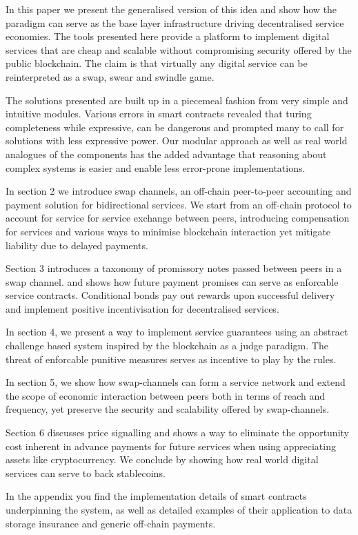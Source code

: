 \documentclass[a4paper,10pt]{article}
\begin{document}
In this paper we present the generalised version of this idea and show how the paradigm
can serve as the base layer infrastructure driving decentralised service economies.
The tools presented here provide a platform to implement digital services that are
cheap and scalable without compromising security offered by the public blockchain.
The claim is that virtually any digital service can be reinterpreted as a swap, swear and swindle game.

The solutions presented are built up in a piecemeal fashion from very simple and intuitive
modules. Various errors in smart contracts revealed that turing completeness while expressive, can
be dangerous and prompted many to call for solutions with less expressive power.
Our modular approach as well as real world analogues of the components has the added
advantage that reasoning about complex systems is easier
and enable less error-prone implementations.

In section 2 we introduce swap channels, an off-chain peer-to-peer accounting and
payment solution for bidirectional services. We start from an off-chain protocol to
account for service for service exchange between peers, introducing compensation for services
and various ways to minimise blockchain interaction yet mitigate liability due to delayed payments.

Section 3 introduces a taxonomy of promissory notes passed between peers in a swap channel.
and shows how future payment promises can serve as enforcable service contracts.
Conditional bonds pay out rewards upon successful delivery and
implement positive incentivisation for decentralised services.

In section 4, we present a way to implement service guarantees using an abstract
challenge based system inspired by the blockchain as a judge paradigm. The threat
of enforcable punitive measures serves as incentive to play by the rules.

In section 5, we show how swap-channels can form a service network and extend the
scope of economic interaction between peers both in terms of reach and frequency, yet
preserve the security and scalability offered by swap-channels.

Section 6 discusses price signalling and shows a way to eliminate the opportunity cost
inherent in advance payments for future services when using appreciating assets like cryptocurrency.
We conclude by showing how real world digital services can serve to back stablecoins.

In the appendix you find the implementation details of smart contracts underpinning the
system, as well as detailed examples of their application to data storage insurance and
generic off-chain payments.
\end{document}

